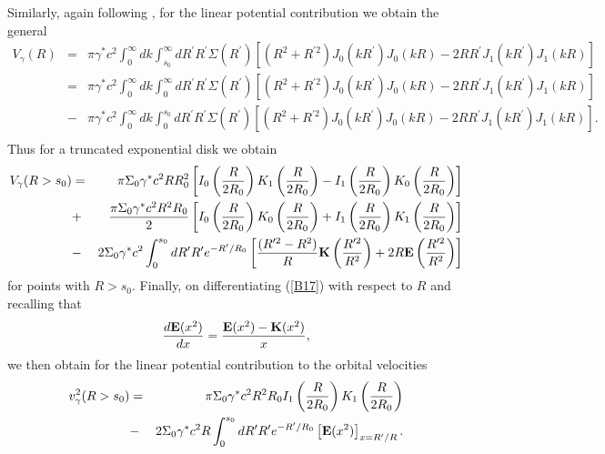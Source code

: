 \documentclass[preprint,aps]{revtex4}
\begin{document}
Similarly, again following \cite{Mannheim2006}, for the linear potential contribution we obtain the general
% 
\begin{eqnarray}
V_{\gamma}(R)&=& \pi \gamma^* c^2\int_0^{\infty}dk\int_{s_0}^{\infty}dR^{\prime}R^{\prime}\Sigma(R^{\prime})\left[(R^2+R^{\prime 2})J_0(kR^{\prime})J_0(kR)
-2RR^{\prime}J_1(kR^{\prime})J_1(kR)\right]
\nonumber\\
&=&\pi \gamma^* c^2\int_0^{\infty}dk\int_{0}^{\infty}dR^{\prime}R^{\prime}\Sigma(R^{\prime})\left[(R^2+R^{\prime 2})J_0(kR^{\prime})J_0(kR)
-2RR^{\prime}J_1(kR^{\prime})J_1(kR)\right]
\nonumber\\
&-&\pi \gamma^* c^2\int_0^{\infty}dk\int_{0}^{s_0}dR^{\prime}R^{\prime}\Sigma(R^{\prime})\left[(R^2+R^{\prime 2})J_0(kR^{\prime})J_0(kR)
-2RR^{\prime}J_1(kR^{\prime})J_1(kR)\right].
\nonumber\\
\label{B16}
\end{eqnarray} 
% 
Thus for a truncated exponential disk we obtain
% 
\begin{eqnarray}
V_{\gamma}(R>s_0)&=& \pi \Sigma_0 \gamma^*c^2 RR_0^2\left[I_0\left(\frac{R}{2R_0}
\right)K_1\left(\frac{R}{2R_0}\right)-
I_1\left(\frac{R}{2R_0}\right)
K_0\left(\frac{R}{2R_0}\right)\right]
\nonumber\\
&+& \frac{\pi \Sigma_0 \gamma^*c^2 R^2R_0}{2}\left[I_0\left(\frac{R}{2R_0}
\right)K_0\left(\frac{R}{2R_0}\right)+
I_1\left(\frac{R}{2R_0}\right)
K_1\left(\frac{R}{2R_0}\right)\right]
\nonumber\\
&-&2 \Sigma_0\gamma^* c^2\int_{0}^{s_0}dR^{\prime}R^{\prime}e^{-R^{\prime}/R_0}\left[\frac{(R^{\prime 2}-R^2)}{R}{\bf K}\left(\frac{R^{\prime 2}}{R^2}\right)
+2R{\bf E}\left(\frac{R^{\prime 2}}{R^2}\right)\right]
\label{B17}
\end{eqnarray} 
% 
for points with $R>s_0$. Finally, on differentiating (\ref{B17}) with respect to $R$ and recalling that
%
\begin{equation}
\frac{d{\bf E}(x^2)}{dx}=\frac{{\bf E}(x^2)-{\bf K}(x^2)}{x},
\label{B18}
\end{equation}
%
we then obtain for the linear potential contribution to the orbital velocities
% 
\begin{eqnarray}
v^2_{\gamma}(R>s_0)&=& \pi \Sigma_0 \gamma^*c^2 R^2R_0I_1\left(\frac{R}{2R_0}
\right)K_1\left(\frac{R}{2R_0}\right)
\nonumber\\
&-&2 \Sigma_0\gamma^* c^2R\int_{0}^{s_0}dR^{\prime}R^{\prime}e^{-R^{\prime}/R_0}
\left[{\bf E}(x^2)\right]_{x=R^{\prime }/R}.
\label{B19}
\end{eqnarray} 
% 
\end{document}
